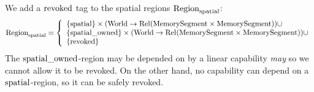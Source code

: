 \begin{jversion}
We add a $\mathrm{revoked}$ tag to the spatial regions $\mathrm{Region}_\mathrm{spatial}$:
\[
  \mathrm{Region}_\mathrm{spatial} = \left\{
  \begin{array}{l}
    \{\mathrm{spatial} \} \times (\mathrm{World} \rightarrow \mathrm{Rel}(\mathrm{MemorySegment} \times \mathrm{MemorySegment})) \cup \\
    \{\mathrm{spatial\_owned} \} \times (\mathrm{World} \rightarrow \mathrm{Rel}(\mathrm{MemorySegment} \times \mathrm{MemorySegment})) \cup \\
    \{\mathrm{revoked} \}
  \end{array} \right.
\]
The $\mathrm{spatial\_owned}$-region may be depended on by a linear capability \emph{may} so we cannot allow it to be revoked.
On the other hand, no capability can depend on a $\mathrm{spatial}$-region, so it can be safely revoked.


\end{jversion}

